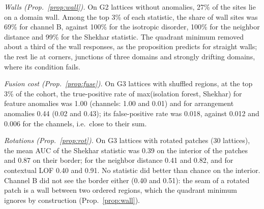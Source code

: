 \documentclass[preprint,review,12pt]{elsarticle}
\begin{document}
\begin{table}[t]
\caption{Survival of feature-anomaly sites at the cohort's top 3\% (G1, $s=3$, 20 lattices per shape): threshold occupancy $p^{*}$ of Eq.~\eqref{eq:pstar}, predicted share of anomalous sites with occupancy $\ge p^{*}$, and measured shares above the top-3\% threshold of each score.}
\label{tab:p2}
\centering\footnotesize
{}
\end{table}

\emph{Walls (Prop.~\ref{prop:wall}).} On G2 lattices without anomalies, 27\% of the sites lie on a domain wall. Among the top 3\% of each statistic, the share of wall sites was 69\% for channel B, against 100\% for the isotropic disorder, 100\% for the neighbor distance and 99\% for the Shekhar statistic. The quadrant minimum removed about a third of the wall responses, as the proposition predicts for straight walls; the rest lie at corners, junctions of three domains and strongly drifting domains, where its condition fails.

\emph{Fusion cost (Prop.~\ref{prop:fuse}).} On G3 lattices with shuffled regions, at the top 3\% of the cohort, the true-positive rate of max(isolation forest, Shekhar) for feature anomalies was 1.00 (channels: 1.00 and 0.01) and for arrangement anomalies 0.44 (0.02 and 0.43); its false-positive rate was 0.018, against 0.012 and 0.006 for the channels, i.e.\ close to their sum.

\emph{Rotations (Prop.~\ref{prop:rot}).} On G3 lattices with rotated patches (30 lattices), the mean AUC of the Shekhar statistic was 0.39 on the interior of the patches and 0.87 on their border; for the neighbor distance 0.41 and 0.82, and for contextual LOF 0.40 and 0.91. No statistic did better than chance on the interior. Channel B did not see the border either (0.40 and 0.51): the seam of a rotated patch is a wall between two ordered regions, which the quadrant minimum ignores by construction (Prop.~\ref{prop:wall}).
\end{document}
